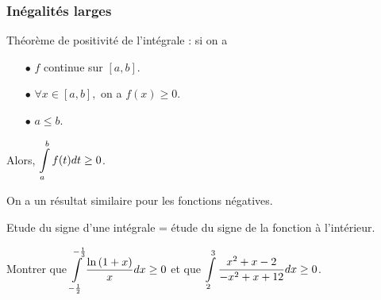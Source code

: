 \documentclass[a4paper, 11pt]{article}
\begin{document}
{{	\subsubsection{Inégalités larges}
	\begin{theorem} Th\'eor\`{e}me de positivit\'e de l'int\'egrale : si on a
		\vsec %
		\begin{itemize}
			\item[$\bullet$] $f$ continue sur $[a,b]$.
			\item[$\bullet$] $\forall x \in [a,b],$ on a  $f(x) \geq 0$.
			\item[$\bullet$] $a\leq b$.
		\end{itemize}
		Alors, $\displaystyle \int\limits_a^b f(t)dt \geq 0$.
	\end{theorem}

}\vsec

\begin{rem}
	On a un r\'esultat similaire pour les fonctions n\'egatives.
\end{rem}




\begin{dboxminipage}{11cm}

	Etude du signe d'une int\'egrale = \'etude du signe de la fonction \`a l'int\'erieur.
\end{dboxminipage}






{\footnotesize \begin{exo}
	Montrer que $\displaystyle\int\limits_{-\frac{1}{2}}^{-\frac{1}{3}} \displaystyle\frac{\ln{(1+x)}}{x} dx \geq 0$ et que $\displaystyle \int\limits_{2}^{3} \displaystyle\frac{x^2+x-2}{-x^2+x+12} dx \geq 0$.
\end{exo}}
\vsec\vsec

}
\end{document}
